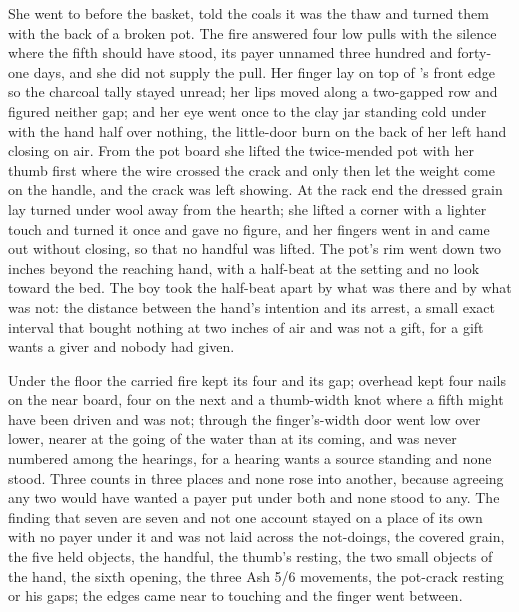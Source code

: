 She went to  before the basket, told the coals it was the thaw and turned them with the back of a broken pot. The fire answered four low pulls with the silence where the fifth should have stood, its payer unnamed three hundred and forty-one days, and she did not supply the pull. Her finger lay on top of 's front edge so the charcoal tally stayed unread; her lips moved along a two-gapped row and figured neither gap; and her eye went once to the clay jar standing cold under  with the hand half over nothing, the little-door burn on the back of her left hand closing on air. From the pot board she lifted the twice-mended pot with her thumb first where the wire crossed the crack and only then let the weight come on the handle, and the crack was left showing. At the rack end the dressed grain lay turned under wool away from the hearth; she lifted a corner with a lighter touch and turned it once and gave no figure, and her fingers went in and came out without closing, so that no handful was lifted. The pot's rim went down two inches beyond the reaching hand, with a half-beat at the setting and no look toward the bed. The boy took the half-beat apart by what was there and by what was not: the distance between the hand's intention and its arrest, a small exact interval that bought nothing at two inches of air and was not a gift, for a gift wants a giver and nobody had given.

Under the floor the carried fire kept its four and its gap; overhead  kept four nails on the near board, four on the next and a thumb-width knot where a fifth might have been driven and was not; through the finger's-width door  went low over lower, nearer at the going of the water than at its coming, and was never numbered among the hearings, for a hearing wants a source standing and none stood. Three counts in three places and none rose into another, because agreeing any two would have wanted a payer put under both and none stood to any. The finding that seven are seven and not one account stayed on a place of its own with no payer under it and was not laid across the not-doings, the covered grain, the five held objects, the handful, the thumb's resting, the two small objects of the hand, the sixth opening, the three Ash 5/6 movements, the pot-crack resting or his gaps; the edges came near to touching and the finger went between.

